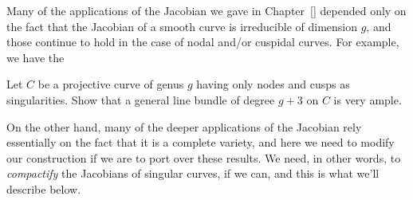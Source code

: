 Many of the applications of the Jacobian we gave in Chapter~\ref{} depended only on the fact that the Jacobian of a smooth curve is irreducible of dimension $g$, and those continue to hold in the case of nodal and/or cuspidal curves. For example, we have the

\begin{exercise}
Let $C$ be a projective curve of genus $g$ having only nodes and cusps as singularities. Show that a general line bundle of degree $g+3$ on $C$ is very ample.
\end{exercise}

On the other hand, many of the deeper applications of the Jacobian rely essentially on the fact that it is a complete variety, and here we need to modify our construction if we are to port over these results. We need, in other words, to \emph{compactify} the Jacobians of singular curves, if we can, and this is what we'll describe below.

